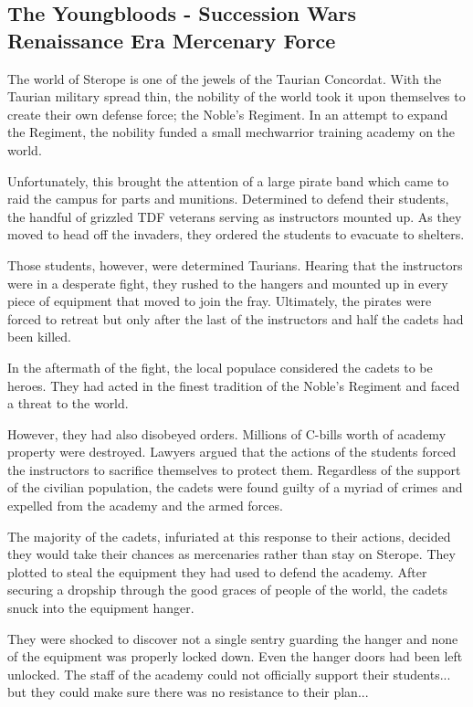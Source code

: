 \subsection{The Youngbloods - Succession Wars Renaissance Era Mercenary Force}

The world of Sterope is one of the jewels of the Taurian Concordat.
With the Taurian military spread thin, the nobility of the world took it upon themselves to create their own defense force; the Noble’s Regiment.
In an attempt to expand the Regiment, the nobility funded a small mechwarrior training academy on the world.

Unfortunately, this brought the attention of a large pirate band which came to raid the campus for parts and munitions.
Determined to defend their students, the handful of grizzled TDF veterans serving as instructors mounted up.
As they moved to head off the invaders, they ordered the students to evacuate to shelters.

Those students, however, were determined Taurians.
Hearing that the instructors were in a desperate fight, they rushed to the hangers and mounted up in every piece of equipment that moved to join the fray.
Ultimately, the pirates were forced to retreat but only after the last of the instructors and half the cadets had been killed.

In the aftermath of the fight, the local populace considered the cadets to be heroes.
They had acted in the finest tradition of the Noble’s Regiment and faced a threat to the world.

However, they had also disobeyed orders.
Millions of C-bills worth of academy property were destroyed.
Lawyers argued that the actions of the students forced the instructors to sacrifice themselves to protect them.
Regardless of the support of the civilian population, the cadets were found guilty of a myriad of crimes and expelled from the academy and the armed forces.

The majority of the cadets, infuriated at this response to their actions, decided they would take their chances as mercenaries rather than stay on Sterope.
They plotted to steal the equipment they had used to defend the academy.
After securing a dropship through the good graces of people of the world, the cadets snuck into the equipment hanger.

They were shocked to discover not a single sentry guarding the hanger and none of the equipment was properly locked down. Even the hanger doors had been left unlocked.
The staff of the academy could not officially support their students... but they could make sure there was no resistance to their plan...
          	
